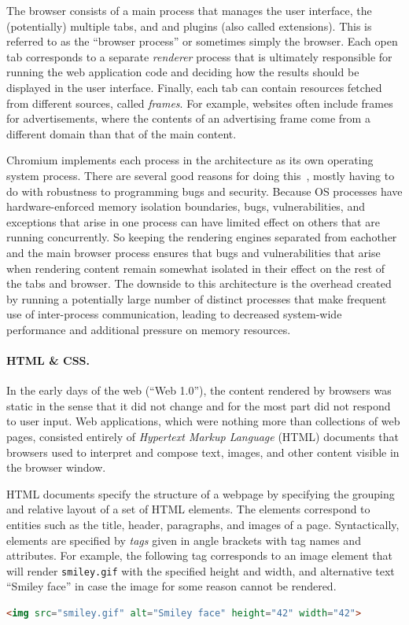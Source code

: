 \documentclass[11pt,twoside]{scrartcl}
\begin{document}
The browser consists of a main process that manages the user interface, the (potentially) multiple tabs, and and plugins (also called extensions). This is referred to as the ``browser process'' or sometimes simply the browser. 
Each open tab corresponds to a separate \emph{renderer} process that is ultimately responsible for running the web application code and deciding how the results should be displayed in the user interface.
Finally, each tab can contain resources fetched from different sources, called \emph{frames}.
For example, websites often include frames for advertisements, where the contents of an advertising frame come from a different domain than that of the main content.

Chromium implements each process in the architecture as its own operating system process. There are several good reasons for doing this~\cite{Barthe08}, mostly having to do with robustness to programming bugs and security. Because OS processes have hardware-enforced memory isolation boundaries, bugs, vulnerabilities, and exceptions that arise in one process can have limited effect on others that are running concurrently. So keeping the rendering engines separated from eachother and the main browser process ensures that bugs and vulnerabilities that arise when rendering content remain somewhat isolated in their effect on the rest of the tabs and browser. The downside to this architecture is the overhead created by running a potentially large number of distinct processes that make frequent use of inter-process communication, leading to decreased system-wide performance and additional pressure on memory resources.

\paragraph{HTML \& CSS.} In the early days of the web (``Web 1.0''), the content rendered by browsers was static in the sense that it did not change and for the most part did not respond to user input. Web applications, which were nothing more than collections of web pages, consisted entirely of \emph{Hypertext Markup Language} (HTML) documents that browsers used to interpret and compose text, images, and other content visible in the browser window. 

HTML documents specify the structure of a webpage by specifying the grouping and relative layout of a set of HTML elements. The elements correspond to entities such as the title, header, paragraphs, and images of a page. Syntactically, elements are specified by \emph{tags} given in angle brackets with tag names and attributes. For example, the following tag corresponds to an image element that will render \verb'smiley.gif' with the specified height and width, and alternative text ``Smiley face'' in case the image for some reason cannot be rendered.
\begin{lstlisting}[language=HTML]
<img src="smiley.gif" alt="Smiley face" height="42" width="42">
\end{lstlisting}
\end{document}
